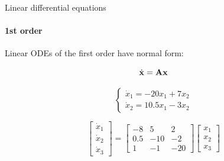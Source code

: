 \documentclass{beamer}
\begin{document}
\begin{frame}{Linear differential equations}
\framesubtitle{1st order}
\begin{flushleft}

Linear ODEs of the first order have normal form:

\begin{equation}
    \dot{\mathbf{x}} = \mathbf{A} \mathbf{x}
\end{equation}

\begin{example}
\begin{equation}
\begin{cases}
    \dot{x}_1 = -20 x_1 + 7 x_2 \\
    \dot{x}_2 = 10.5 x_1 - 3 x_2
\end{cases}
\end{equation}
\end{example}

\begin{example}
\begin{equation}
\begin{bmatrix}
\dot{x}_1 \\
\dot{x}_2 \\
\dot{x}_3
\end{bmatrix} 
= 
\begin{bmatrix}
-8   & 5   & 2  \\
 0.5 & -10 & -2 \\
 1   & -1 & -20
\end{bmatrix}
\begin{bmatrix}
x_1 \\
x_2 \\
x_3
\end{bmatrix} 
\end{equation}
\end{example}

\end{flushleft}
\end{frame}
\end{document}
